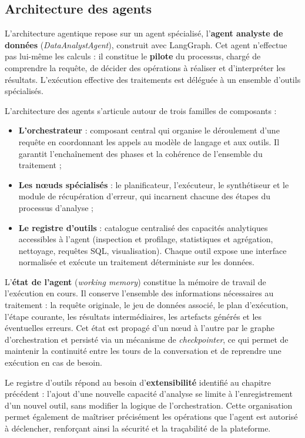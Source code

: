 \subsection{Architecture des agents}

L'architecture agentique repose sur un agent spécialisé, l'\textbf{agent analyste de données} (\textit{DataAnalystAgent}), construit avec LangGraph. Cet agent n'effectue pas lui-même les calculs : il constitue le \textbf{pilote} du processus, chargé de comprendre la requête, de décider des opérations à réaliser et d'interpréter les résultats. L'exécution effective des traitements est déléguée à un ensemble d'outils spécialisés.

L'architecture des agents s'articule autour de trois familles de composants :

\begin{itemize}
  \item \textbf{L'orchestrateur} : composant central qui organise le déroulement d'une requête en coordonnant les appels au modèle de langage et aux outils. Il garantit l'enchaînement des phases et la cohérence de l'ensemble du traitement ;
  \item \textbf{Les nœuds spécialisés} : le planificateur, l'exécuteur, le synthétiseur et le module de récupération d'erreur, qui incarnent chacune des étapes du processus d'analyse ;
  \item \textbf{Le registre d'outils} : catalogue centralisé des capacités analytiques accessibles à l'agent (inspection et profilage, statistiques et agrégation, nettoyage, requêtes SQL, visualisation). Chaque outil expose une interface normalisée et exécute un traitement déterministe sur les données.
\end{itemize}

L'\textbf{état de l'agent} (\textit{working memory}) constitue la mémoire de travail de l'exécution en cours. Il conserve l'ensemble des informations nécessaires au traitement : la requête originale, le jeu de données associé, le plan d'exécution, l'étape courante, les résultats intermédiaires, les artefacts générés et les éventuelles erreurs. Cet état est propagé d'un nœud à l'autre par le graphe d'orchestration et persisté via un mécanisme de \textit{checkpointer}, ce qui permet de maintenir la continuité entre les tours de la conversation et de reprendre une exécution en cas de besoin.

Le registre d'outils répond au besoin d'\textbf{extensibilité} identifié au chapitre précédent : l'ajout d'une nouvelle capacité d'analyse se limite à l'enregistrement d'un nouvel outil, sans modifier la logique de l'orchestration. Cette organisation permet également de maîtriser précisément les opérations que l'agent est autorisé à déclencher, renforçant ainsi la sécurité et la traçabilité de la plateforme.

